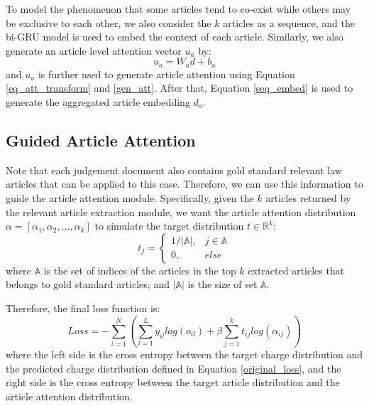 To model the phenomenon that some articles tend to co-exist while others may be exclusive to each other, we also consider the $k$ articles as a sequence, and the bi-GRU model is used to embed the context of each article. Similarly, we also generate an article level attention vector $u_{a}$ by:
\begin{equation}
u_a = W_a d + b_a
\end{equation}
and $u_a$ is further used to generate article attention using Equation \ref{eq_att_transform} and \ref{gen_att}. After that, Equation \ref{seq_embed} is used to generate the aggregated article embedding $d_a$. 

\subsection{Guided Article Attention}
Note that each judgement document also contains gold standard relevant law articles that can be applied to this case. Therefore, we can use this information to guide the article attention module. Specifically, given the $k$ articles returned by the relevant article extraction module, we want the article attention distribution $\alpha=[\alpha_1, \alpha_2, ..., \alpha_k]$ to simulate the target distribution $t\in\mathbb{R}^k$:
\begin{equation}
t_j=
\begin{cases}
1/|\mathbb{A}|,	& j\in \mathbb{A}\\
0,	& else
\end{cases}
\end{equation}
where $\mathbb{A}$ is the set of indices of the articles in the top $k$ extracted articles that belongs to gold standard articles, and $|\mathbb{A}|$ is the size of set $\mathbb{A}$. 

Therefore, the final loss function is:
\begin{equation}
\label{final_loss}
Loss = -\sum_{i=1}^N(\sum_{l=1}^L{y_{il} log(o_{il})} + \beta \sum_{j=1}^k{t_{ij} log(\alpha_{ij})})
\end{equation}
where the left side is the cross entropy between the target charge distribution and the predicted charge distribution defined in Equation \ref{original_loss}, and the right side is the cross entropy between the target article distribution and the article attention distribution. 